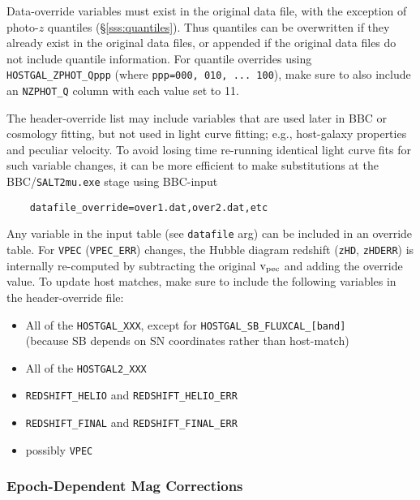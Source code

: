 \documentclass[12pt]{article}
\newcommand{\vpec}{{\rm v}_{\rm pec}}
\begin{document}
Data-override variables must exist in the original data file,
with the exception of photo-$z$ quantiles (\S\ref{sss:quantiles}).
Thus quantiles can be overwritten if they already exist in the
original data files, 
or appended if the original data files
do not include quantile information. For quantile overrides using
{\tt HOSTGAL\_ZPHOT\_Qppp} (where {\tt ppp=000, 010, ... 100}), 
make sure to also include an {\tt NZPHOT\_Q} column with each value set to 11.


\clearpage

The header-override list may include variables that are used later in 
BBC or cosmology fitting, but not used in light curve fitting;
e.g., host-galaxy properties and peculiar velocity. To avoid 
losing time re-running identical light curve fits for such variable changes,
it can be more efficient to make substitutions at the 
BBC/{\tt SALT2mu.exe} stage using BBC-input 
\vspace{-0.2cm}
\begin{verbatim}
    datafile_override=over1.dat,over2.dat,etc
\end{verbatim}
Any variable in the input table (see {\tt datafile} arg) can be
included in an override table.
For {\tt VPEC} ({\tt VPEC\_ERR}) changes, the Hubble diagram 
redshift ({\tt zHD}, {\tt zHDERR}) is internally re-computed by subtracting
the original $\vpec$ and adding the override value.
To update host matches, make sure to include the following variables
in the header-override file:
\vspace{-0.1cm}
\begin{itemize}[noitemsep]
   \item All of the {\tt HOSTGAL\_XXX},
            except for {\tt HOSTGAL\_SB\_FLUXCAL\_[band]} \\
     (because SB depends on SN coordinates rather than host-match)
   \item All of the {\tt HOSTGAL2\_XXX}
   \item {\tt REDSHIFT\_HELIO} and {\tt REDSHIFT\_HELIO\_ERR}
   \item {\tt REDSHIFT\_FINAL} and {\tt REDSHIFT\_FINAL\_ERR}
   \item possibly {\tt VPEC}
\end{itemize}

\clearpage
\subsubsection{Epoch-Dependent Mag Corrections}
\label{sss:magcor}
\end{document}
